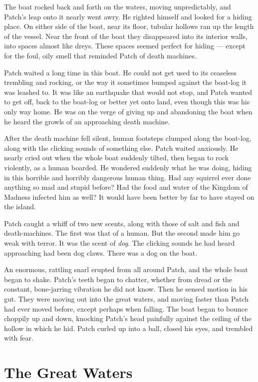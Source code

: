 \documentclass[12pt]{book}
\begin{document}
The boat rocked back and forth on the waters, moving unpredictably, and Patch's leap onto it nearly went awry. He righted himself and looked for a hiding place. On either side of the boat, near its floor, tubular hollows ran up the length of the vessel. Near the front of the boat they disappeared into its interior walls, into spaces almost like dreys. These spaces seemed perfect for hiding ---
except for the foul, oily smell that reminded Patch of death machines.

Patch waited a long time in this boat. He could not get used to its ceaseless trembling and rocking, or the way it sometimes bumped against the boat-log it was leashed to. It was like an earthquake that would not stop, and Patch wanted to get off, back to the boat-log or better yet onto land, even though this was his only way home. He was on the verge of giving up and abandoning the boat when he heard the growls of an approaching death machine.

After the death machine fell silent, human footsteps clumped along the boat-log, along with the clicking sounds of something else. Patch waited anxiously. He nearly cried out when the whole boat suddenly tilted, then began to rock violently, as a human boarded. He wondered suddenly what he was doing, hiding in this horrible and horribly dangerous human thing. Had any squirrel ever done anything so mad and stupid before? Had the food and water of the Kingdom of Madness infected him as well? It would have been better by far to have stayed on the island.

Patch caught a whiff of two new scents, along with those of salt and fish and death-machines. The first was that of a human. But the second made him go weak with terror. It was the scent of {\it dog}. The clicking sounds he had heard approaching had been dog claws. There was a dog on the boat.

An enormous, rattling snarl erupted from all around Patch, and the whole boat began to shake. Patch's teeth began to chatter, whether from dread or the constant, bone-jarring vibration he did not know. Then he sensed motion in his gut. They were moving out into the great waters, and moving faster than Patch had ever moved before, except perhaps when falling. The boat began to bounce choppily up and down, knocking Patch's head painfully against the ceiling of the hollow in which he hid. Patch curled up into a ball, closed his eyes, and trembled with fear.


\section{The Great Waters}
\end{document}
